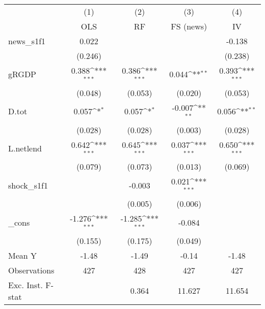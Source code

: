 {
\def\sym#1{\ifmmode^{#1}\else\(^{#1}\)\fi}
\begin{tabular}{l*{4}{c}}
\toprule
            &\multicolumn{1}{c}{(1)}&\multicolumn{1}{c}{(2)}&\multicolumn{1}{c}{(3)}&\multicolumn{1}{c}{(4)}\\
            &\multicolumn{1}{c}{OLS}&\multicolumn{1}{c}{RF}&\multicolumn{1}{c}{FS (news)}&\multicolumn{1}{c}{IV}\\
\midrule
news\_s1f1   &       0.022         &                     &                     &      -0.138         \\
            &     (0.246)         &                     &                     &     (0.238)         \\
\addlinespace
gRGDP       &       0.388\sym{***}&       0.386\sym{***}&       0.044\sym{**} &       0.393\sym{***}\\
            &     (0.048)         &     (0.053)         &     (0.020)         &     (0.053)         \\
\addlinespace
D.tot       &       0.057\sym{*}  &       0.057\sym{*}  &      -0.007\sym{**} &       0.056\sym{**} \\
            &     (0.028)         &     (0.028)         &     (0.003)         &     (0.028)         \\
\addlinespace
L.netlend   &       0.642\sym{***}&       0.645\sym{***}&       0.037\sym{***}&       0.650\sym{***}\\
            &     (0.079)         &     (0.073)         &     (0.013)         &     (0.069)         \\
\addlinespace
shock\_s1f1  &                     &      -0.003         &       0.021\sym{***}&                     \\
            &                     &     (0.005)         &     (0.006)         &                     \\
\addlinespace
\_cons      &      -1.276\sym{***}&      -1.285\sym{***}&      -0.084         &                     \\
            &     (0.155)         &     (0.175)         &     (0.049)         &                     \\
\midrule
Mean Y      &       -1.48         &       -1.49         &       -0.14         &       -1.48         \\
Observations&         427         &         428         &         427         &         427         \\
Exc. Inst. F-stat&                     &       0.364         &      11.627         &      11.654         \\
\bottomrule
\end{tabular}
}

